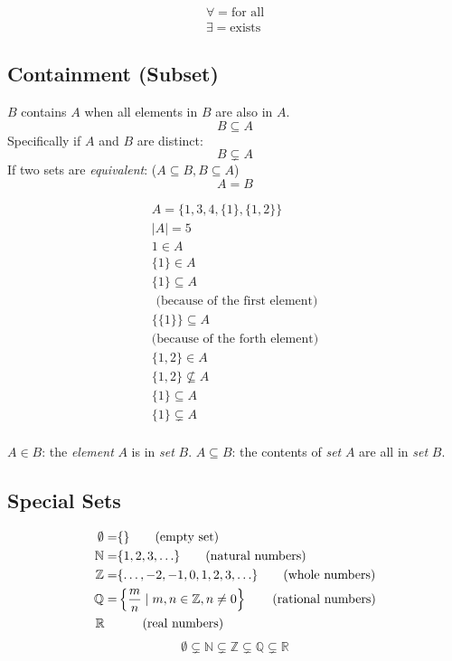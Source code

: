 \documentclass[00_complete]{subfiles}
\begin{document}
\begin{symbols}[Quantifiers]
$$
\begin{gathered}
    \forall = \text{for all} \\
    \exists = \text{exists}
\end{gathered}
$$
\end{symbols}

\subsection{Containment (Subset)}
\begin{definition}[Containment]
$B$ contains $A$ when all elements in $B$ are also in $A$.
$$B \subseteq A$$
Specifically if $A$ and $B$ are distinct:
$$B \subsetneq A$$
If two sets are \emph{equivalent}: ($A \subseteq B, B \subseteq A$)
$$A=B$$
\end{definition}

\begin{example}
$$
\begin{gathered}
    A = \{1,3,4, \{1\}, \{1,2\}\} \\
    |A| = 5 \\
    1 \in A \\
    \{1\} \in A \\
    \{1\} \subseteq A \\
    \text{ (because of the first element)} \\
    \{\{1\}\} \subseteq A \\
    \text{(because of the forth element)} \\
    \{1,2\} \in A \\
    \{1,2\} \nsubseteq A \\
    \{1\} \subseteq A \\
    \{1\} \subsetneq A \\
\end{gathered}
$$
\end{example}

\begin{note}
$A \in B$: the \emph{element} $A$ is in \emph{set} $B$.
$A \subseteq B$: the contents of \emph{set} $A$ are all in \emph{set} $B$.
\end{note}

\subsection{Special Sets}

\begin{align}
    \emptyset  =& \{\} \tag{\text{empty set}} \\
    \mathbb{N} =& \{1,2,3,\mathellipsis\} \tag{\text{natural numbers}} \\
    \mathbb{Z} =& \{\mathellipsis,-2,-1,0,1,2,3,\mathellipsis\}
    \tag{\text{whole numbers}} \\
    \mathbb{Q} =& \left\{ \frac{m}{n} \;|\; m,n \in \mathbb{Z}, n \neq 0
    \right\}\tag{\text{rational numbers}} \\
        \mathbb{R} \quad& \tag{\text{real numbers}}
\end{align}
$$
    \emptyset \subsetneq
    \mathbb{N} \subsetneq
    \mathbb{Z} \subsetneq
    \mathbb{Q} \subsetneq
    \mathbb{R}
$$
\end{document}

